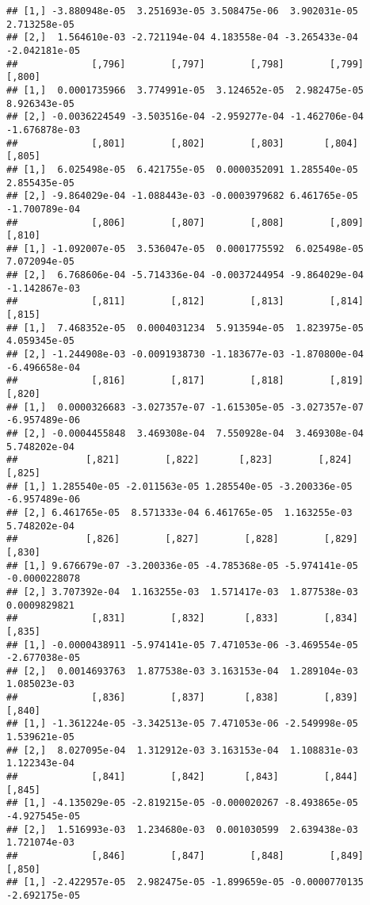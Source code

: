 \documentclass[
]{article}
\begin{document}
\begin{verbatim}
## [1,] -3.880948e-05  3.251693e-05 3.508475e-06  3.902031e-05  2.713258e-05
## [2,]  1.564610e-03 -2.721194e-04 4.183558e-04 -3.265433e-04 -2.042181e-05
##             [,796]        [,797]        [,798]        [,799]        [,800]
## [1,]  0.0001735966  3.774991e-05  3.124652e-05  2.982475e-05  8.926343e-05
## [2,] -0.0036224549 -3.503516e-04 -2.959277e-04 -1.462706e-04 -1.676878e-03
##             [,801]        [,802]        [,803]       [,804]        [,805]
## [1,]  6.025498e-05  6.421755e-05  0.0000352091 1.285540e-05  2.855435e-05
## [2,] -9.864029e-04 -1.088443e-03 -0.0003979682 6.461765e-05 -1.700789e-04
##             [,806]        [,807]        [,808]        [,809]        [,810]
## [1,] -1.092007e-05  3.536047e-05  0.0001775592  6.025498e-05  7.072094e-05
## [2,]  6.768606e-04 -5.714336e-04 -0.0037244954 -9.864029e-04 -1.142867e-03
##             [,811]        [,812]        [,813]        [,814]        [,815]
## [1,]  7.468352e-05  0.0004031234  5.913594e-05  1.823975e-05  4.059345e-05
## [2,] -1.244908e-03 -0.0091938730 -1.183677e-03 -1.870800e-04 -6.496658e-04
##             [,816]        [,817]        [,818]        [,819]        [,820]
## [1,]  0.0000326683 -3.027357e-07 -1.615305e-05 -3.027357e-07 -6.957489e-06
## [2,] -0.0004455848  3.469308e-04  7.550928e-04  3.469308e-04  5.748202e-04
##            [,821]        [,822]       [,823]        [,824]        [,825]
## [1,] 1.285540e-05 -2.011563e-05 1.285540e-05 -3.200336e-05 -6.957489e-06
## [2,] 6.461765e-05  8.571333e-04 6.461765e-05  1.163255e-03  5.748202e-04
##            [,826]        [,827]        [,828]        [,829]        [,830]
## [1,] 9.676679e-07 -3.200336e-05 -4.785368e-05 -5.974141e-05 -0.0000228078
## [2,] 3.707392e-04  1.163255e-03  1.571417e-03  1.877538e-03  0.0009829821
##             [,831]        [,832]       [,833]        [,834]        [,835]
## [1,] -0.0000438911 -5.974141e-05 7.471053e-06 -3.469554e-05 -2.677038e-05
## [2,]  0.0014693763  1.877538e-03 3.163153e-04  1.289104e-03  1.085023e-03
##             [,836]        [,837]       [,838]        [,839]       [,840]
## [1,] -1.361224e-05 -3.342513e-05 7.471053e-06 -2.549998e-05 1.539621e-05
## [2,]  8.027095e-04  1.312912e-03 3.163153e-04  1.108831e-03 1.122343e-04
##             [,841]        [,842]       [,843]        [,844]        [,845]
## [1,] -4.135029e-05 -2.819215e-05 -0.000020267 -8.493865e-05 -4.927545e-05
## [2,]  1.516993e-03  1.234680e-03  0.001030599  2.639438e-03  1.721074e-03
##             [,846]        [,847]        [,848]        [,849]        [,850]
## [1,] -2.422957e-05  2.982475e-05 -1.899659e-05 -0.0000770135 -2.692175e-05

\end{verbatim}
\end{document}
